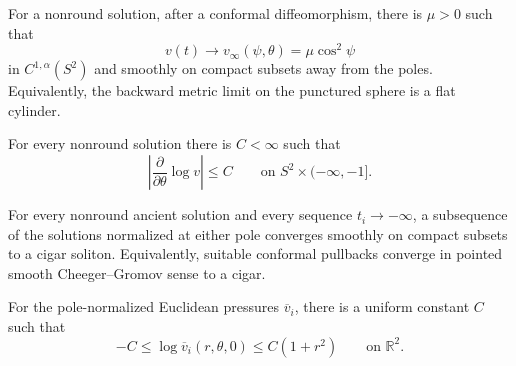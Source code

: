 \begin{proposition}
\label{prop:chow-iv-backward-pressure-cylinder}


For a nonround solution, after a conformal diffeomorphism, there is \(\mu>0\)
such that
\[
 v(t)\longrightarrow v_\infty(\psi,\theta)=\mu\cos^2\psi
\]
in \(C^{1,\alpha}(S^2)\) and smoothly on compact subsets away from the poles.
Equivalently, the backward metric limit on the punctured sphere is a flat
cylinder.
\end{proposition}

\begin{corollary}
\label{cor:chow-iv-angular-pressure-gradient-bound}


For every nonround solution there is \(C<\infty\) such that
\[
 \left|\frac{\partial}{\partial\theta}\log v\right|\le C
 \qquad\text{on }S^2\times(-\infty,-1].
\]
\end{corollary}

\begin{proposition}
\label{prop:chow-iv-poles-converge-to-cigars}


For every nonround ancient solution and every sequence \(t_i\to-\infty\), a
subsequence of the solutions normalized at either pole converges smoothly on
compact subsets to a cigar soliton.  Equivalently, suitable conformal
pullbacks converge in pointed smooth Cheeger--Gromov sense to a cigar.
\end{proposition}

\begin{lemma}
\label{lem:chow-iv-rescaled-pressure-growth}

For the pole-normalized Euclidean pressures \(\overline v_i\), there is a
uniform constant \(C\) such that
\[
 -C\le\log\overline v_i(r,\theta,0)\le C(1+r^2)
 \qquad\text{on }\mathbb R^2.
\]
\end{lemma}

